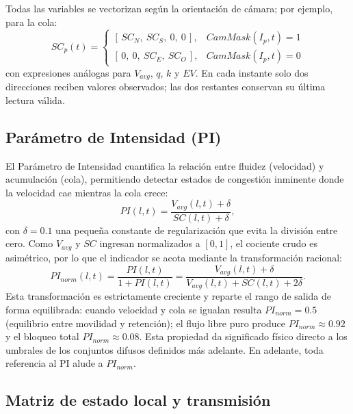 Todas las variables se vectorizan según la orientación de cámara; por ejemplo, para la cola:
\[
SC_{p}(t) =
\begin{cases}
\left[\, SC_{N},\ SC_{S},\ 0,\ 0 \,\right], & CamMask(I_{p},t) = 1\\[2pt]
\left[\, 0,\ 0,\ SC_{E},\ SC_{O} \,\right], & CamMask(I_{p},t) = 0
\end{cases}
\]
con expresiones análogas para $V_{avg}$, $q$, $k$ y $EV$. En cada instante solo dos
direcciones reciben valores observados; las dos restantes conservan su última lectura válida.

\subsection{Parámetro de Intensidad (PI)}\label{subsec:pi}

El Parámetro de Intensidad cuantifica la relación entre fluidez (velocidad) y acumulación
(cola), permitiendo detectar estados de congestión inminente donde la velocidad cae mientras
la cola crece:
\[
PI(l,t) = \frac{V_{avg}(l,t)+\delta}{SC(l,t)+\delta},
\]
con $\delta=0.1$ una pequeña constante de regularización que evita la división entre cero. Como
$V_{avg}$ y $SC$ ingresan normalizados a $[0,1]$, el cociente crudo es asimétrico, por lo que
el indicador se acota mediante la transformación racional:
\[
PI_{norm}(l,t) = \frac{PI(l,t)}{1+PI(l,t)}
= \frac{V_{avg}(l,t)+\delta}{V_{avg}(l,t)+SC(l,t)+2\delta}.
\]
Esta transformación es estrictamente creciente y reparte el rango de salida de forma
equilibrada: cuando velocidad y cola se igualan resulta $PI_{norm}=0.5$ (equilibrio entre
movilidad y retención); el flujo libre puro produce $PI_{norm}\approx 0.92$ y el bloqueo total
$PI_{norm}\approx 0.08$. Esta propiedad da significado físico directo a los umbrales de los
conjuntos difusos definidos más adelante. En adelante, toda referencia al PI alude a
$PI_{norm}$.

\subsection{Matriz de estado local y transmisión}\label{subsec:matriz-estado}

